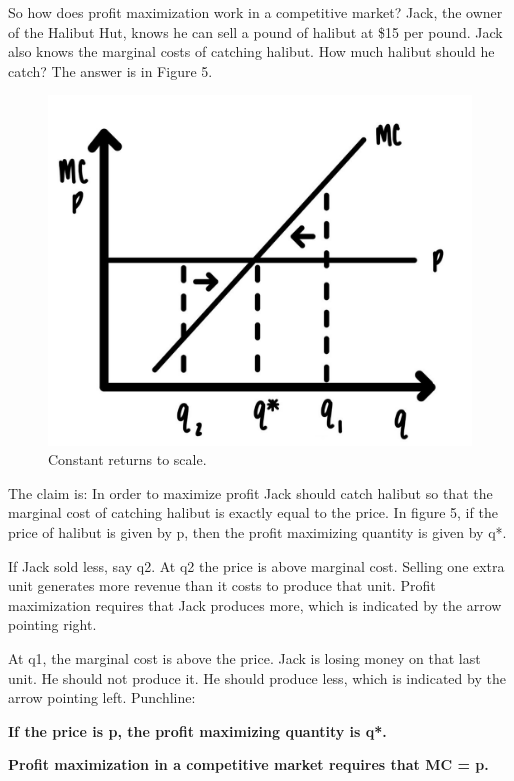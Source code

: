 \documentclass[
]{book}
\begin{document}
So how does profit maximization work in a competitive market? Jack, the owner of the Halibut Hut, knows he can sell a pound of halibut at \$15 per pound. Jack also knows the marginal costs of catching halibut. How much halibut should he catch? The answer is in Figure 5.

\begin{figure}

{\centering \includegraphics[width=0.75\linewidth]{img/supply/fig5} 

}

\caption{Constant returns to scale.}\label{fig:supply05}
\end{figure}

The claim is: In order to maximize profit Jack should catch halibut so that the marginal cost of catching halibut is exactly equal to the price. In figure 5, if the price of halibut is given by p, then the profit maximizing quantity is given by q*.

If Jack sold less, say q2. At q2 the price is above marginal cost. Selling one extra unit generates more revenue than it costs to produce that unit. Profit maximization requires that Jack produces more, which is indicated by the arrow pointing right.

At q1, the marginal cost is above the price. Jack is losing money on that last unit. He should not produce it. He should produce less, which is indicated by the arrow pointing left.
Punchline:

\begin{iucolor}
\textbf{If the price is p, the profit maximizing quantity is q*.}

\textbf{Profit maximization in a competitive market requires that MC = p.}

\end{iucolor}
\end{document}
